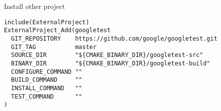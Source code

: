 
\begin{numberedframe}{Install other project}
\begin{lstlisting}
include(ExternalProject)
ExternalProject_Add(googletest
  GIT_REPOSITORY    https://github.com/google/googletest.git
  GIT_TAG           master
  SOURCE_DIR        "${CMAKE_BINARY_DIR}/googletest-src"
  BINARY_DIR        "${CMAKE_BINARY_DIR}/googletest-build"
  CONFIGURE_COMMAND ""
  BUILD_COMMAND     ""
  INSTALL_COMMAND   ""
  TEST_COMMAND      ""
)
\end{lstlisting}

\end{numberedframe}
